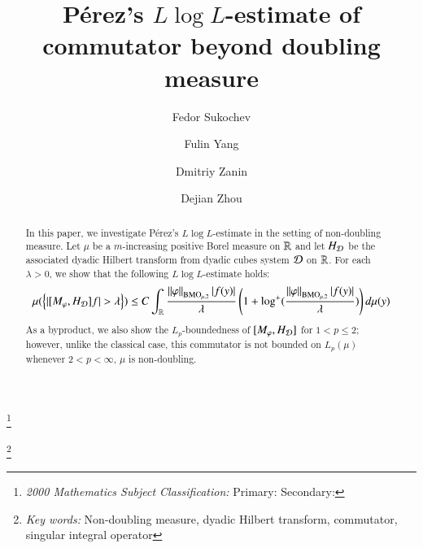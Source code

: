 \documentclass[leqno]{amsart}
\begin{document}
\title[$L\log L$-estimate of Commutator]{P\'{e}rez's $L\log L$-estimate of commutator beyond doubling measure}

\thanks{{\it 2000 Mathematics Subject Classification:} Primary:  Secondary: }

\thanks{{\it Key words:} Non-doubling measure, dyadic Hilbert transform, commutator, singular integral operator}


\author{Fedor Sukochev}
\address{School of Mathematics and Statistics, UNSW, Kensington, NSW 2052, Australia}



\author{Fulin Yang}
\address{School of Mathematics, Harbin Institute of Technology, Harbin 150001, China}


\author{Dmitriy Zanin}
\address{School of Mathematics and Statistics, UNSW, Kensington, NSW 2052, Australia}


\author{Dejian Zhou}
\address{}
\email{}






\date{}


\begin{abstract}
	In this paper, we investigate  P\'{e}rez's $L\log L$-estimate in the setting of non-doubling measure. Let $\mu$ be a $m$-increasing positive Borel measure on ${\mathbb R}$ and let $H_{{\mathcal D}}$ be the associated dyadic Hilbert transform from dyadic cubes system ${\mathcal D}$ on ${\mathbb R}$. For each $\lambda>0$, we show that the following $L\log L$-estimate holds:
	\begin{align*}
		\mu(\set{|[M_{\varphi},H_{\D}]f|>\lambda})\leq C
		\int_{\RR}\frac{\Norm{\varphi}_{\BMO_{\mu,2}}|f(y)|}{\lambda}\left(1+\log^{+}(\frac{\Norm{\varphi}_{\BMO_{\mu,2}}|f(y)|}{\lambda})\right)d\mu(y)
	\end{align*}
	As a byproduct, we also show the $L_p$-boundedness of $[M_{\varphi},H_{{\mathcal D}}]$ for $1<p\leq2$; however, unlike the classical case, this commutator is not bounded on $L_p(\mu)$ whenever $2<p<\infty$, $\mu$ is non-doubling.
\end{abstract}

\maketitle
\end{document}
